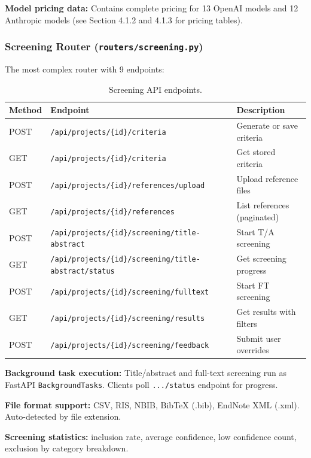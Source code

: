 \documentclass[11pt,a4paper]{article}
\begin{document}
\textbf{Model pricing data:} Contains complete pricing for 13 OpenAI models and 12 Anthropic models (see Section 4.1.2 and 4.1.3 for pricing tables).

\subsubsection{Screening Router (\texttt{routers/screening.py})}

The most complex router with 9 endpoints:

\begin{table}[H]
\centering\small
\begin{tabular}{llp{4cm}}
\toprule
\textbf{Method} & \textbf{Endpoint} & \textbf{Description} \\
\midrule
POST & \texttt{/api/projects/\{id\}/criteria} & Generate or save criteria \\
GET & \texttt{/api/projects/\{id\}/criteria} & Get stored criteria \\
POST & \texttt{/api/projects/\{id\}/references/upload} & Upload reference files \\
GET & \texttt{/api/projects/\{id\}/references} & List references (paginated) \\
POST & \texttt{/api/projects/\{id\}/screening/title-abstract} & Start T/A screening \\
GET & \texttt{/api/projects/\{id\}/screening/title-abstract/status} & Get screening progress \\
POST & \texttt{/api/projects/\{id\}/screening/fulltext} & Start FT screening \\
GET & \texttt{/api/projects/\{id\}/screening/results} & Get results with filters \\
POST & \texttt{/api/projects/\{id\}/screening/feedback} & Submit user overrides \\
\bottomrule
\end{tabular}
\caption{Screening API endpoints.}
\end{table}

\textbf{Background task execution:} Title/abstract and full-text screening run as FastAPI \texttt{BackgroundTasks}. Clients poll \texttt{.../status} endpoint for progress.

\textbf{File format support:} CSV, RIS, NBIB, BibTeX (.bib), EndNote XML (.xml). Auto-detected by file extension.

\textbf{Screening statistics:} inclusion rate, average confidence, low confidence count, exclusion by category breakdown.
\end{document}
